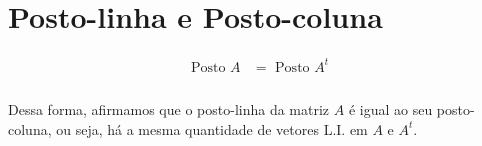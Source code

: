 \documentclass{article}
\begin{document}
    \section{Posto-linha e Posto-coluna}
        \begin{align*}
            \text{Posto } A &= \text{ Posto } A^t\\
        \end{align*}

        \paragraph{}
        Dessa forma, afirmamos que o posto-linha da matriz $A$ é igual ao seu posto-coluna, ou seja, há a mesma quantidade de vetores
        L.I. em $A$ e $A^t$.
\end{document}
